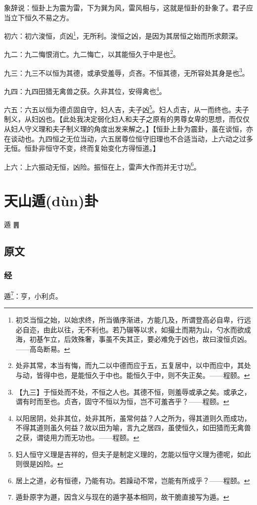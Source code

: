 \documentclass[12pt,oneside]{book}
\begin{document}
象辞说：恒卦上为震为雷，下为巽为风，雷风相与，这就是恒卦的卦象了。君子应当立下恒久不易之方。

初六：初六浚恒，贞凶\footnote{初爻当恒之始，以始求终，所当循序渐进，方能几及，所谓登高必自卑，行远必自迩，由此以往，无不利也。若乃辍等以求，如撮土而期为山，勺水而欲成海，初基乍立，后效殊奢，事虽不失其正，要必难免于凶也，故曰浚恒贞凶。——高岛断易。}，无所利。浚恒之凶，是因为其居恒之始而所求颇深。

九二：九二悔恨消亡。九二悔亡，以其能恒久于中是也\footnote{处非其常，本当有悔，而九二以中德而应于五，五复居中，以中而应中，其处与动，皆得中也，是能恒久于中也。能恒久于中，则不失正矣。——程颐。}。

九三：九三不以恒为其德，或承受羞辱，贞吝。不恒其德，无所容处其身是也\footnote{【九三】于恒处而不处，不恒之人也。其德不恒，则羞辱或承之矣。或承之，谓有时而至也。贞吝，固守不恒以为恒，岂不可羞吝乎？——程颐。}。

九四：九四田猎无禽兽之获。久非其位，安得禽也\footnote{以阳居阴，处非其位，处非其所，虽常何益？人之所为，得其道则久而成功，不得其道则虽久何益？故以田为喻，言九之居四，虽使恒久，如田猎而无禽兽之获，谓徒用力而无功也。——程颐。}。

六五：六五以恒为德贞固自守，妇人吉，夫子凶\footnote{妇人恒守义理是吉祥的，但夫子是制定义理的，怎能以恒守义理为德呢，如此则很是凶险。}。妇人贞吉，从一而终也。夫子制义，从妇凶也。【此处我决定弱化妇人和夫子之原有的男尊女卑的思想，而仅仅从妇人守义理和夫子制义理的角度出发来解之。】【恒卦上卦为震卦，虽在谈恒，亦在谈动也。九四恒之无位当动，六五居尊位恒守旧理也不合适当动，上六动之过多无恒。恒卦非恒守不变，终而复始变化方得恒道。】

上六：上六振动无恒，凶险。振恒在上，雷声大作而并无寸功\footnote{居上之道，必有恒德，乃能有功。若躁动不常，岂能有所成乎？——程颐。}。


\chapter{天山遁(dùn)卦}
遁 {\Large ䷠}

\section{原文}

\subsection{经}
遁\footnote{遁卦原字为遯，因含义与现在的遁字基本相同，故干脆直接写为遁。}：亨，小利贞。
\end{document}

